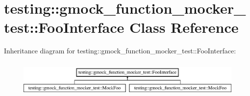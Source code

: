 \hypertarget{classtesting_1_1gmock__function__mocker__test_1_1_foo_interface}{}\section{testing\+::gmock\+\_\+function\+\_\+mocker\+\_\+test\+::Foo\+Interface Class Reference}
\label{classtesting_1_1gmock__function__mocker__test_1_1_foo_interface}
Inheritance diagram for testing\+::gmock\+\_\+function\+\_\+mocker\+\_\+test\+::Foo\+Interface\+:\begin{figure}[H]
\begin{center}
\leavevmode
\includegraphics[height=1.854305cm]{d0/df2/classtesting_1_1gmock__function__mocker__test_1_1_foo_interface}
\end{center}
\end{figure}
